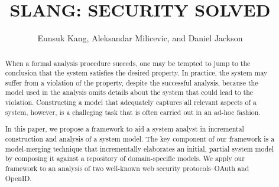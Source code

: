 \documentclass{llncs}
\begin{document}
%

\title{SLANG: SECURITY SOLVED}
%
%
\author{Eunsuk Kang, Aleksandar Milicevic, and Daniel Jackson}
%

\maketitle              %

\begin{abstract}
  When a formal analysis procedure suceeds, one may be tempted to jump to
  the conclusion that the system satisfies the desired property. In
  practice, the system may suffer from a violation of the property,
  despite the successful analysis, because the model used in the
  analysis omits details about the system that could lead to the
  violation. Constructing a model that adequately captures all
  relevant aspects of a system, however, is a challeging task that is
  often carried out in an ad-hoc fashion.

  In this paper, we propose a framework to aid a
  system analyst in incremental construction and analysis of a system
  model. The key component of our framework is a model-merging
  technique that incrementally elaborates an initial, partial system
  model by composing it against a repository of domain-specific
  models. We apply our framework to an analysis of two well-known web
  security protocols--OAuth and OpenID.
\end{abstract}










%
%
%







\end{document}
